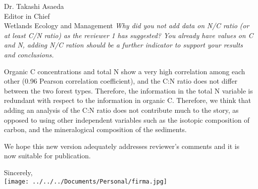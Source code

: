\documentclass[11pt]{bgcletter}
\begin{document}
\begin{letter}{Dr. Takashi Asaeda\\
 Editor in Chief \\ Wetlands Ecology and Management}
{\it Why did you not add data on N/C ratio (or at least C/N ratio) as the reviewer 1 has suggested? You already have values on C and N, adding N/C ration should be a further indicator to support your results and conclusions.}

{\color{blue} Organic C concentrations and total N show a very high correlation among each other (0.96 Pearson correlation coefficient), and the C:N ratio does not differ between the two forest types. Therefore, the information in the total N variable is redundant with respect to the information in organic C. Therefore, we think that adding an analysis of the C:N ratio does not contribute much to the story, as opposed to using other independent variables such as the isotopic composition of carbon, and the mineralogical composition of the sediments. }


\vspace{2em}
We hope this new version adequately addresses reviewer's comments and it is now suitable for publication.

\closing{Sincerely, \\
 \texttt{[image: ../../../Documents/Personal/firma.jpg]}
 }
 \end{letter}

 
\end{document}
